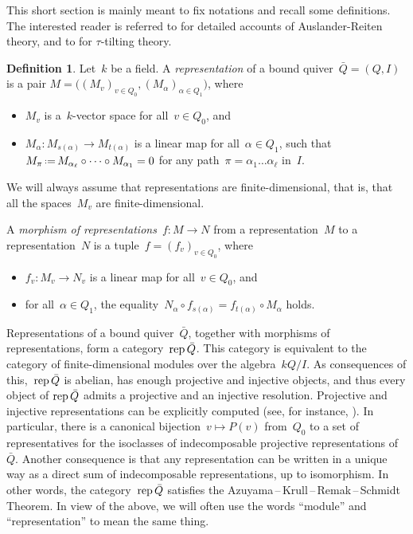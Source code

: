\documentclass{amsart}
\theoremstyle{definition}
\newtheorem{definition}[theorem]{Definition}
\newcommand{\eqdef}{\mbox{\,\raisebox{0.2ex}{\scriptsize\ensuremath{\mathrm:}}\ensuremath{=}\,}} %
\newcommand{\darkblue}{\color{darkblue}} %
\newcommand{\defn}[1]{\textsl{\darkblue #1}} %
\newcommand{\rep}{\operatorname{{\rm rep}}}
\begin{document}
This short section is mainly meant to fix notations and recall some definitions.  The interested reader is referred to \cite{AssemSimsonSkowronski, Schiffler} for detailed accounts of Auslander-Reiten theory, and to \cite{AdachiIyamaReiten} for $\tau$-tilting theory.

\begin{definition}
Let~$k$ be a field.
A \defn{representation} of a bound quiver~$\bar Q = (Q,I)$ is a pair ${M = \big( (M_v)_{v\in Q_0}, (M_\alpha)_{\alpha\in Q_1} \big)}$, where
\begin{itemize}
\item $M_v$ is a~$k$-vector space for all~$v\in Q_0$, and
\item $M_\alpha: M_{s(\alpha)} \to M_{t(\alpha)}$ is a linear map for all~$\alpha \in Q_1$, such that~$M_\pi \eqdef M_{\alpha_\ell} \circ \dots \circ M_{\alpha_1} = 0$ for any path~$\pi = \alpha_1 \dots \alpha_\ell$ in~$I$.
\end{itemize}
%
We will always assume that representations are finite-dimensional, that is, that all the spaces~$M_v$ are finite-dimensional.

A \defn{morphism of representations}~$f:M\to N$ from a representation~$M$ to a representation~$N$ is a tuple~$f=(f_v)_{v\in Q_0}$, where
\begin{itemize}
\item $f_v:M_v\to N_v$ is a linear map for all~$v\in Q_0$, and
\item for all~$\alpha\in Q_1$, the equality~$N_\alpha \circ f_{s(\alpha)} = f_{t(\alpha)} \circ M_\alpha$ holds.
\end{itemize}
\end{definition}

Representations of a bound quiver~$\bar Q$, together with morphisms of representations, form a category~$\rep \bar Q$.
This category is equivalent to the category of finite-dimensional modules over the algebra~$kQ/I$.
As consequences of this,~$\rep \bar Q$ is abelian, has enough projective and injective objects, and thus every object of $\rep \bar Q$ admits a projective and an injective resolution.
Projective and injective representations can be explicitly computed (see, for instance, \cite[Chapter III.2]{AssemSimsonSkowronski}).
In particular, there is a canonical bijection~$v\mapsto P(v)$ from~$Q_0$ to a set of representatives for the isoclasses of indecomposable projective representations of~$\bar Q$.
Another consequence is that any representation can be written in a unique way as a direct sum of indecomposable representations, up to isomorphism.
In other words, the category~$\rep \bar Q$ satisfies the \mbox{Azuyama\,--\,Krull\,--\,Remak\,--\,Schmidt} Theorem.
In view of the above, we will often use the words ``module'' and ``representation'' to mean the same thing.
\end{document}
